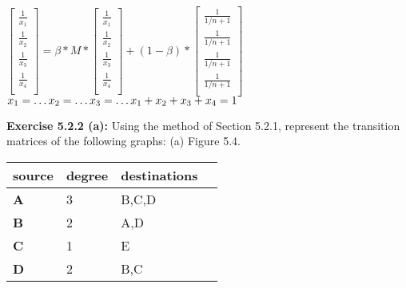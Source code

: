 \documentclass{exam}
\begin{document}
\begin{questions}
$\begin{bmatrix}
       \frac{1}{x_{1}} \\
       \frac{1}{x_{2}}\\
       \frac{1}{x_{3}}\\
        \frac{1}{x_{4}}\\     
     \end{bmatrix}  = \beta * M * \begin{bmatrix}
       \frac{1}{x_{1}} \\
       \frac{1}{x_{2}}\\
       \frac{1}{x_{3}}\\
        \frac{1}{x_{4}}\\     
     \end{bmatrix} + (1 - \beta) * \begin{bmatrix}
       \frac{1}{1/n+1} \\
       \frac{1}{1/n+1}\\
       \frac{1}{1/n+1}\\
        \frac{1}{1/n+1}\\     
     \end{bmatrix}$ \\
     
     $x_{1} = \dots \\
     x_{2} = \dots \\
     x_{3} = \dots \\
     x_{1} + x_{2} + x_{3} + x_{4} = 1$


\question \textbf{Exercise 5.2.2 (a):} Using the method of Section 5.2.1, represent the transition matrices of the following graphs: (a) Figure 5.4.  \\ 

\begin{tabular}{ | l | l | l | l |}
    \hline
    \textbf{source} & \textbf{degree} & \textbf{destinations} \\ \hline
    \textbf{A} & 3 & B,C,D \\ \hline
    \textbf{B} & 2 &  A,D \\ \hline
    \textbf{C} & 1 & E \\ \hline
      \textbf{D} & 2 & B,C  \\
    \hline
    \end{tabular}
    

\end{questions}
\end{document}
